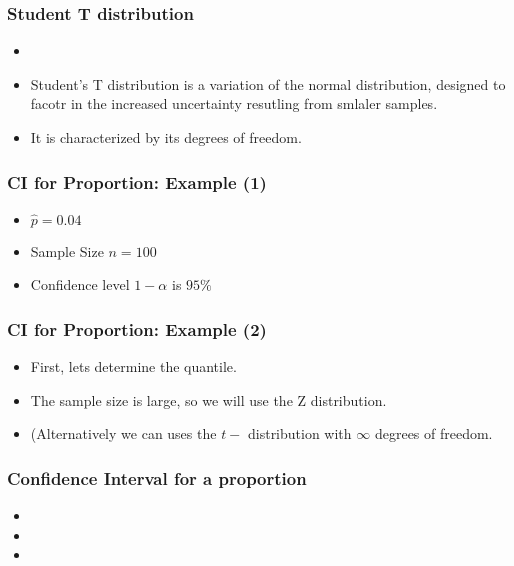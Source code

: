 \documentclass[a4]{beamer}
\begin{document}

\begin{frame}\frametitle{Student T distribution}

\begin{itemize}
\item 
\item Student's T distribution is a variation of the normal distribution, designed to facotr in the increased uncertainty resutling from smlaler samples.
\item  It is characterized by its degrees of freedom.
\end{itemize}

\end{frame}

\begin{frame}
\frametitle{CI for Proportion: Example (1)}

\begin{itemize}
\item $\hat{p}  = 0.04$
\item Sample Size $n=100$
\item Confidence level $1-\alpha$ is $95\%$
\end{itemize}

\end{frame}

\begin{frame}\frametitle{CI for Proportion: Example (2)}

\begin{itemize}
\item First, lets determine the quantile.
\item The sample size is large, so we will use the Z distribution.
\item (Alternatively we can uses the $t-$ distribution with $\infty$ degrees of freedom.
\end{itemize}

\end{frame}

\begin{frame}
\frametitle{Confidence Interval for a proportion}

\begin{itemize}
\item
\item
\item
\end{itemize}

\end{frame}
\end{document}
